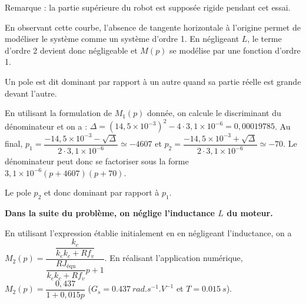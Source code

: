 Remarque : la partie supérieure du robot est supposée rigide pendant cet essai.
\fi

\ifprof
\begin{corrige}
En observant cette courbe, l'absence de tangente horizontale à l'origine permet de modéliser le système comme un système d'ordre 1.  En négligeant $L$, le terme d'ordre 2 devient donc négligeable et $M(p)$ se modélise par une fonction d'ordre 1. 
\end{corrige}
\else
\fi


\ifprof
\else
\begin{remarque}
Un pole est dit dominant par rapport à un autre quand sa partie réelle est grande devant l'autre.
\end{remarque}
\fi

\ifprof
\begin{corrige}
En utilisant la formulation de $M_1(p)$ donnée, on calcule le discriminant du dénominateur et on a : 
$\Delta = \left(14,5\times 10^{-3}\right)^2 - 4\cdot 3,1 \times 10^{-6} = 0,00019785 $. 
Au final, $p_1 = \dfrac{-14,5\times 10^{-3}-\sqrt{\Delta}}{2\cdot 3,1 \times 10^{-6}}\simeq -4607$ et $p_2 = \dfrac{-14,5\times 10^{-3}+\sqrt{\Delta}}{2\cdot 3,1 \times 10^{-6}}\simeq -70$. 
Le dénominateur peut donc se factoriser sous la forme $ 3,1 \times 10^{-6}\left( p + 4607\right)\left(p+70\right)$.

Le pole $p_2$ et donc dominant par rapport à $p_1$.
\end{corrige}
\else
\fi

\ifprof
\else
\textbf{Dans la suite du problème, on néglige l’inductance $L$ du moteur.}
\fi

\ifprof
\begin{corrige}
En utilisant l'expression établie initialement en en négligeant l'inductance, on a 
$  M_2(p)=\dfrac{\dfrac{k_c}{k_e k_c+Rf_v}}{  \dfrac{ RJ_{\text{équ}}  }{k_e k_c+Rf_v}p +1 }$.
En réalisant l'application numérique, $M_2(p)=\dfrac{0,437}{1+0,015p}$ 
($G_s = \SI{0,437}{rad.s^{-1}.V^{-1}}$ 
et $T=\SI{0,015}{s}$).
\end{corrige}
\else
\fi


